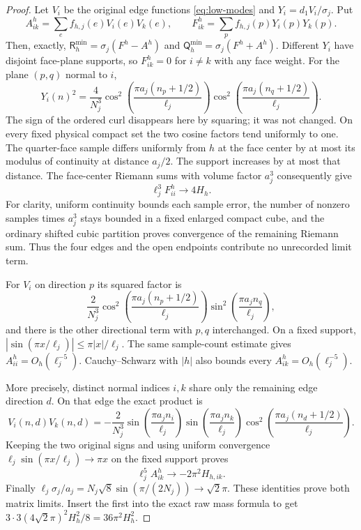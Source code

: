 \begin{proof}
Let $V_i$ be the original edge functions \eqref{eq:low-modes} and
$Y_i=d_1V_i/\sigma_j$. Put
\[
 A^h_{ik}=\sum_ef_{h,j}(e)V_i(e)V_k(e),\qquad
 F^h_{ik}=\sum_pf_{h,j}(p)Y_i(p)Y_k(p).
\]
Then, exactly,
$\mathsf R_h^{\min}=\sigma_j(F^h-A^h)$ and
$\mathsf Q_h^{\min}=\sigma_j(F^h+A^h)$.
Different $Y_i$ have disjoint face-plane supports, so $F^h_{ik}=0$
for $i\ne k$ with any face weight.
For the plane $(p,q)$ normal to $i$,
\[
 Y_i(n)^2=\frac4{N_j^3}
 \cos^2\left(\frac{\pi a_j(n_p+1/2)}{\ell_j}\right)
 \cos^2\left(\frac{\pi a_j(n_q+1/2)}{\ell_j}\right).
\]
The sign of the ordered curl disappears here by squaring; it was not
changed. On every fixed physical compact set the two cosine factors
tend uniformly to one. The quarter-face sample differs uniformly
from $h$ at the face center by at most its modulus of continuity
at distance $a_j/2$. The support increases by at most that distance.
The face-center Riemann sums with volume factor $a_j^3$ consequently
give
\[
 \ell_j^3 F^h_{ii}\longrightarrow4H_h.
\]
For clarity, uniform continuity bounds each sample error, the number
of nonzero samples times $a_j^3$ stays bounded in a fixed enlarged
compact cube, and the ordinary shifted cubic partition proves
convergence of the remaining Riemann sum. Thus the four edges and
the open endpoints contribute no unrecorded limit term.

For $V_i$ on direction $p$ its squared factor is
\[
 \frac2{N_j^3}
 \cos^2\left(\frac{\pi a_j(n_p+1/2)}{\ell_j}\right)
 \sin^2\left(\frac{\pi a_jn_q}{\ell_j}\right),
\]
and there is the other directional term with $p,q$ interchanged.
On a fixed support, $|\sin(\pi x/\ell_j)|\le\pi|x|/\ell_j$.
The same sample-count estimate gives $A^h_{ii}=O_h(\ell_j^{-5})$.
Cauchy--Schwarz with $|h|$ also bounds every
$A^h_{ik}=O_h(\ell_j^{-5})$.

More precisely, distinct normal indices $i,k$ share only the remaining
edge direction $d$. On that edge the exact product is
\[
 V_i(n,d)V_k(n,d)=
 -\frac2{N_j^3}
 \sin\left(\frac{\pi a_jn_i}{\ell_j}\right)
 \sin\left(\frac{\pi a_jn_k}{\ell_j}\right)
 \cos^2\left(\frac{\pi a_j(n_d+1/2)}{\ell_j}\right).
\]
Keeping the two original signs and using uniform convergence
$\ell_j\sin(\pi x/\ell_j)\to\pi x$ on the fixed support proves
\[
 \ell_j^5 A^h_{ik}\longrightarrow-2\pi^2H_{h,ik}.
\]
Finally $\ell_j\sigma_j/a_j=N_j\sqrt8\sin(\pi/(2N_j))
\to\sqrt2\pi$. These identities prove both matrix limits.
Insert the first into the exact raw mass formula to get
$3\cdot3(4\sqrt2\pi)^2H_h^2/8=36\pi^2H_h^2$.
\end{proof}

